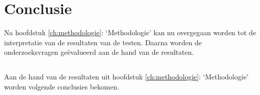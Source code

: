 
\chapter{Conclusie}
\label{ch:conclusie}


Na hoofdstuk \ref{ch:methodologie}: `Methodologie' kan nu overgegaan worden tot de interpretatie van de resultaten van de testen. Daarna worden de onderzoeksvragen geëvalueerd aan de hand van de resultaten. 


\section{}
\label{sec:C-conclusie-resulaten}
Aan de hand van de resultaten uit hoofdstuk \ref{ch:methodologie}: `Methodologie' worden volgende conclusies bekomen.

